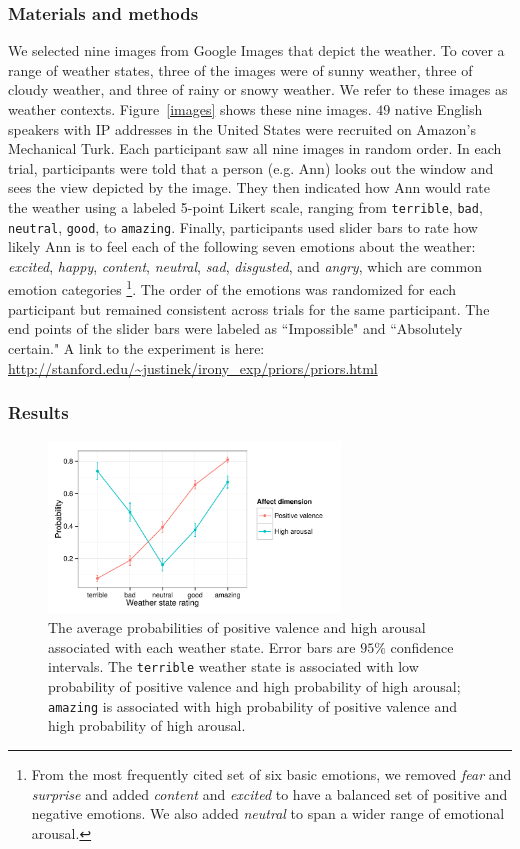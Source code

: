 \documentclass[10pt,letterpaper]{article}
\begin{document}
\subsubsection{Materials and methods}
We selected nine images from Google Images that depict the weather. To cover a range of weather states, three of the images were of sunny weather, three of cloudy weather, and three of rainy or snowy weather. We refer to these images as weather contexts. Figure~\ref{images} shows these nine images.
$49$ native English speakers with IP addresses in the United States were recruited on Amazon's Mechanical Turk. Each participant saw all nine images in random order. In each trial, participants were told that a person (e.g. Ann) looks out the window and sees the view depicted by the image. They then indicated how Ann would rate the weather using a labeled 5-point Likert scale, ranging from \texttt{terrible}, \texttt{bad}, \texttt{neutral}, \texttt{good}, to \texttt{amazing}. Finally, participants used slider bars to rate how likely Ann is to feel each of the following seven emotions about the weather: \emph{excited}, \emph{happy}, \emph{content}, \emph{neutral}, \emph{sad}, \emph{disgusted}, and \emph{angry}, which are common emotion categories \cite{ekman1992argument}\footnote{From the most frequently cited set of six basic emotions, we removed \emph{fear} and \emph{surprise} and added \emph{content} and \emph{excited} to have a balanced set of positive and negative emotions. We also added \emph{neutral} to span a wider range of emotional arousal.}.
The order of the emotions was randomized for each participant but remained consistent across trials for the same participant. The end points of the slider bars were labeled as ``Impossible" and ``Absolutely certain." A link to the experiment is here: \url{http://stanford.edu/~justinek/irony_exp/priors/priors.html}
  
 
\subsubsection{Results}
\begin{figure}
\includegraphics[width=220pt, height=130pt]{affect-prior.pdf}
\caption{The average probabilities of positive valence and high arousal associated with each weather state. Error bars are $95\%$ confidence intervals. The \texttt{terrible} weather state is associated with low probability of positive valence and high probability of high arousal; \texttt{amazing} is associated with high probability of positive valence and high probability of high arousal.}
\label{affect-prior}
\end{figure}
\end{document}
